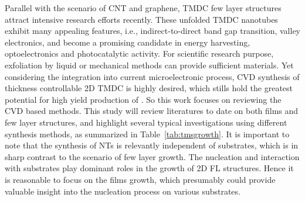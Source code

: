 Parallel with the scenario of CNT and graphene, TMDC few layer structures attract intensive research efforts recently. These unfolded TMDC nanotubes exhibit many appealing features, i.e., indirect-to-direct band gap transition,\cite{Splendiani2010} valley electronics, and become a promising candidate in energy harvesting, optoelectronics and photocatalytic activity. For scientific research purpose, exfoliation by liquid \cite{Smith2011} or mechanical methods \cite{Lee2010a} can provide sufficient materials. Yet considering the integration into current microelectronic process, CVD synthesis of thickness controllable 2D TMDC is highly desired, which stills hold the greatest potential for high yield production of . So this work focuses on reviewing the CVD based methods. This study will review literatures to date on both  films and few layer structures, and highlight several typical investigations using different synthesis methods, as summarized in Table~\ref{tab:tmsgrowth}. It is important to note that the synthesis of NTs is relevantly independent of substrates, which is in sharp contrast to the scenario of few layer growth. The  nucleation and interaction with substrates play dominant roles in the growth of 2D FL structures. Hence it is reasonable to focus on the  films growth, which presumably could provide valuable insight into the nucleation process on various substrates.

